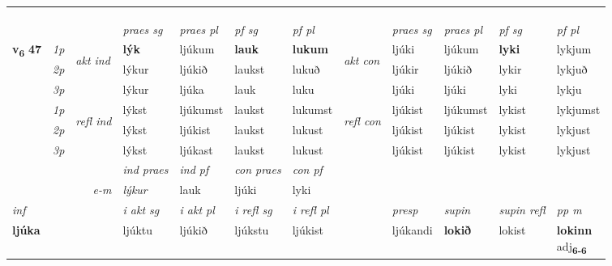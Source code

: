 \begin{longtable}[l]{X>{\footnotesize\itshape}llXXXXlXXXX}
\midrule
& \\*
   & \\*
  & \\
   \midrule
 & &   & \textit{praes sg}  & \textit{praes pl}    & \textit{ pf sg} & \textit{pf pl} & & \textit{praes sg}  & \textit{praes pl}    & \textit{pf sg} & \textit{pf pl }  \\ \cmidrule{4-7} \cmidrule{9-12}
 \multirow{2}{*}{{{\textbf{v{\textsubscript{6}}} \Large{\textbf{47}}}}}  & 1p & \multirow{3}{*}{\begin{turn}{90}\textit{akt ind}\end{turn}} & \textbf{lýk} & ljúkum & \textbf{lauk} & \textbf{lukum} & \multirow{3}{*}{\begin{turn}{90}\textit{akt con}\end{turn}} &ljúki & ljúkum & \textbf{lyki} & lykjum\\*
 & 2p &  &  lýkur  & ljúkið & laukst & lukuð & & ljúkir & ljúkið & lykir & lykjuð \\*
 & 3p &  & lýkur & ljúka & lauk & luku & & ljúki & ljúki& lyki & lykju \\*
\cmidrule{4-7} \cmidrule{9-12}
 & 1p & \multirow{3}{*}{\begin{turn}{90}\textit{refl ind}\end{turn}}  & lýkst & ljúkumst & laukst & lukumst & \multirow{3}{*}{\begin{turn}{90}\textit{refl con}\end{turn}}  &ljúkist & ljúkumst & lykist & lykjumst \\*
 & 2p &  & lýkst & ljúkist & laukst & lukust & &ljúkist & ljúkist & lykist & lykjust \\*
 & 3p  & & lýkst & ljúkast & laukst & lukust & & ljúkist & ljúkist& lykist & lykjust \\*
\cmidrule{4-7} \cmidrule{9-12}

   && &  \textit{ind praes} & \textit{ind pf} & \textit{con praes} & \textit{con pf} \\*
\multicolumn{3}{r}{\textit{e-m}} & lýkur & lauk & ljúki & lyki \\*

\cmidrule{4-7}
   {\textit{inf}} & &  & \textit{i akt sg} & \textit{i akt pl} & \textit{i refl sg} & \textit{i refl pl} && \textit{presp} & \textit{supin} & \textit{supin refl} & \textit{pp m} \\*
  {\textbf{ljúka}} & && ljúktu  & ljúkið & ljúkstu & ljúkist && ljúkandi &  \textbf{lokið} & lokist & \specialcell{\textbf{lokinn} \\ adj\textbf{\textsubscript{6-6}}} \\*


\end{longtable}
